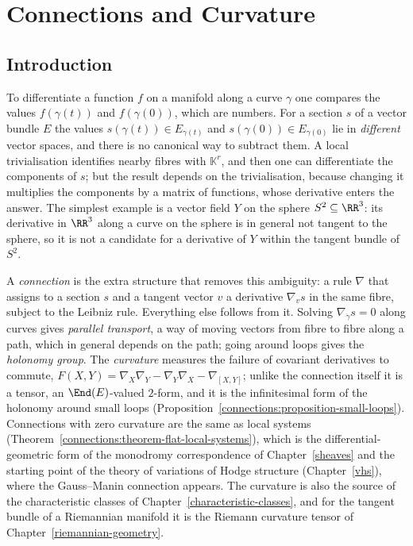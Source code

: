 \chapter{Connections and Curvature}\label{connections}

\section{Introduction}\label{connections:section-introduction}

To differentiate a function $f$ on a manifold along a curve $\gamma$ one compares the values $f(\gamma(t))$ and $f(\gamma(0))$, which are numbers. For a section $s$ of a vector
bundle $E$ the values $s(\gamma(t)) \in E_{\gamma(t)}$ and $s(\gamma(0)) \in E_{\gamma(0)}$ lie in \emph{different} vector spaces, and there is no canonical way to subtract
them. A local trivialisation identifies nearby fibres with $\mathbb{K}^r$, and then one can differentiate the components of $s$; but the result depends on the trivialisation,
because changing it multiplies the components by a matrix of functions, whose derivative enters the answer. The simplest example is a vector field $Y$ on the sphere
$S^2 \subseteq \RR^3$: its derivative in $\RR^3$ along a curve on the sphere is in general not tangent to the sphere, so it is not a candidate for a derivative of $Y$ within
the tangent bundle of $S^2$.

A \emph{connection} is the extra structure that removes this ambiguity: a rule $\nabla$ that assigns to a section $s$ and a tangent vector $v$ a derivative $\nabla_vs$ in the
same fibre, subject to the Leibniz rule. Everything else follows from it. Solving $\nabla_{\dot\gamma}s = 0$ along curves gives \emph{parallel transport}, a way of moving
vectors from fibre to fibre along a path, which in general depends on the path; going around loops gives the \emph{holonomy group}. The \emph{curvature} measures the failure
of covariant derivatives to commute, $F(X, Y) = \nabla_X\nabla_Y - \nabla_Y\nabla_X - \nabla_{[X, Y]}$; unlike the connection itself it is a tensor, an $\End(E)$-valued
$2$-form, and it is the infinitesimal form of the holonomy around small loops (Proposition~\ref{connections:proposition-small-loops}). Connections with zero curvature are the
same as local systems (Theorem~\ref{connections:theorem-flat-local-systems}), which is the differential-geometric form of the monodromy correspondence of
Chapter~\ref{sheaves} and the starting point of the theory of variations of Hodge structure (Chapter~\ref{vhs}), where the Gauss--Manin connection appears. The curvature is
also the source of the characteristic classes of Chapter~\ref{characteristic-classes}, and for the tangent bundle of a Riemannian manifold it is the Riemann curvature tensor
of Chapter~\ref{riemannian-geometry}.

